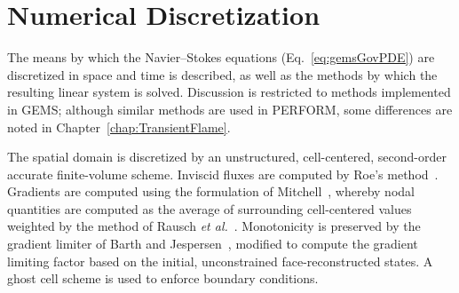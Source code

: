 \section{Numerical Discretization}\label{sec:numerics}
%
The means by which the Navier--Stokes equations (Eq.~\ref{eq:gemsGovPDE}) are discretized in space and time is described, as well as the methods by which the resulting linear system is solved. Discussion is restricted to methods implemented in GEMS; although similar methods are used in PERFORM, some differences are noted in Chapter~\ref{chap:TransientFlame}.

The spatial domain is discretized by an unstructured, cell-centered, second-order accurate finite-volume scheme. Inviscid fluxes are computed by Roe's method~\cite{Roe1981}. Gradients are computed using the formulation of Mitchell~\cite{Mitchell1994}, whereby nodal quantities are computed as the average of surrounding cell-centered values weighted by the method of Rausch \textit{et al.}~\cite{Rausch1991}. Monotonicity is preserved by the gradient limiter of Barth and Jespersen~\cite{Barth1989}, modified to compute the gradient limiting factor based on the initial, unconstrained face-reconstructed states. A ghost cell scheme is used to enforce boundary conditions.

